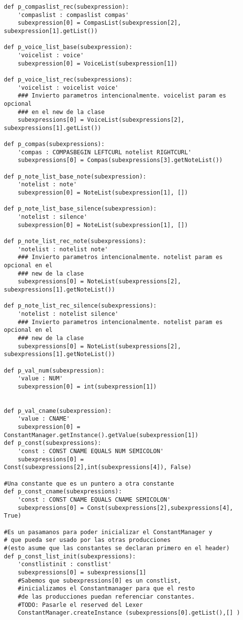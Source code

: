\begin{verbatim}
def p_compaslist_rec(subexpression):
    'compaslist : compaslist compas'
    subexpression[0] = CompasList(subexpression[2], subexpression[1].getList())

def p_voice_list_base(subexpression):
    'voicelist : voice'
    subexpression[0] = VoiceList(subexpression[1])

def p_voice_list_rec(subexpressions):
    'voicelist : voicelist voice'
    ### Invierto parametros intencionalmente. voicelist param es opcional
    ### en el new de la clase
    subexpressions[0] = VoiceList(subexpressions[2], subexpressions[1].getList())

def p_compas(subexpressions):
    'compas : COMPASBEGIN LEFTCURL notelist RIGHTCURL'
    subexpressions[0] = Compas(subexpressions[3].getNoteList())

def p_note_list_base_note(subexpression):
    'notelist : note'
    subexpression[0] = NoteList(subexpression[1], [])

def p_note_list_base_silence(subexpression):
    'notelist : silence'
    subexpression[0] = NoteList(subexpression[1], [])

def p_note_list_rec_note(subexpressions):
    'notelist : notelist note'
    ### Invierto parametros intencionalmente. notelist param es opcional en el
    ### new de la clase
    subexpressions[0] = NoteList(subexpressions[2], subexpressions[1].getNoteList())

def p_note_list_rec_silence(subexpressions):
    'notelist : notelist silence'
    ### Invierto parametros intencionalmente. notelist param es opcional en el
    ### new de la clase
    subexpressions[0] = NoteList(subexpressions[2], subexpressions[1].getNoteList())

def p_val_num(subexpression):
    'value : NUM'
    subexpression[0] = int(subexpression[1])


def p_val_cname(subexpression):
    'value : CNAME'
    subexpression[0] = ConstantManager.getInstance().getValue(subexpression[1])
def p_const(subexpressions):
    'const : CONST CNAME EQUALS NUM SEMICOLON'
    subexpressions[0] = Const(subexpressions[2],int(subexpressions[4]), False)

#Una constante que es un puntero a otra constante
def p_const_cname(subexpressions):
    'const : CONST CNAME EQUALS CNAME SEMICOLON'
    subexpressions[0] = Const(subexpressions[2],subexpressions[4], True)

#Es un pasamanos para poder inicializar el ConstantManager y
# que pueda ser usado por las otras producciones
#(esto asume que las constantes se declaran primero en el header)
def p_const_list_init(subexpressions):
    'constlistinit : constlist'
    subexpressions[0] = subexpressions[1]
    #Sabemos que subexpressions[0] es un constlist, 
    #inicializamos el Constantmanager para que el resto
    #de las producciones puedan referenciar constantes.
    #TODO: Pasarle el reserved del Lexer
    ConstantManager.createInstance (subexpressions[0].getList(),[] )



\end{verbatim}
